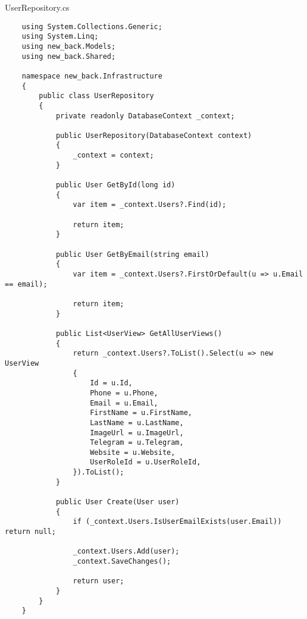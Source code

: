 UserRepository.cs
\lstset{style=sharpc}
\begin{lstlisting}
    using System.Collections.Generic;
    using System.Linq;
    using new_back.Models;
    using new_back.Shared;
    
    namespace new_back.Infrastructure
    {
        public class UserRepository
        {
            private readonly DatabaseContext _context;
            
            public UserRepository(DatabaseContext context)
            {
                _context = context;
            }
            
            public User GetById(long id)
            {
                var item = _context.Users?.Find(id);
    
                return item;
            }
            
            public User GetByEmail(string email)
            {
                var item = _context.Users?.FirstOrDefault(u => u.Email == email);
    
                return item;
            }
            
            public List<UserView> GetAllUserViews()
            {
                return _context.Users?.ToList().Select(u => new UserView
                {
                    Id = u.Id,
                    Phone = u.Phone,
                    Email = u.Email,
                    FirstName = u.FirstName,
                    LastName = u.LastName,
                    ImageUrl = u.ImageUrl,
                    Telegram = u.Telegram,
                    Website = u.Website,
                    UserRoleId = u.UserRoleId,
                }).ToList();
            }
            
            public User Create(User user)
            {
                if (_context.Users.IsUserEmailExists(user.Email)) return null;
                
                _context.Users.Add(user);
                _context.SaveChanges();
    
                return user;
            }
        }
    }
\end{lstlisting}

